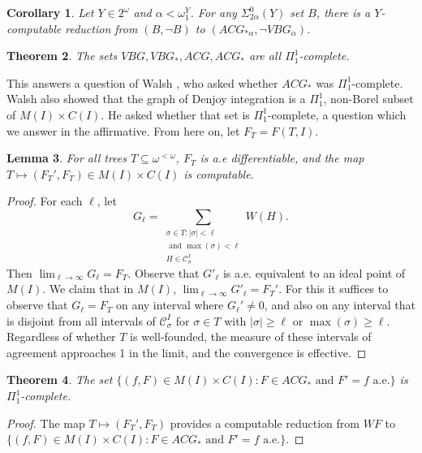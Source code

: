 \documentclass[12pt]{amsart}
\newtheorem{theorem}{Theorem}
\newtheorem{cor}[theorem]{Corollary}
\newtheorem{lemma}[theorem]{Lemma}
\begin{document}
\begin{cor} Let $Y \in 2^\omega$ and $\alpha < \omega_1^Y$. 
For any $\Sigma^0_{2\alpha}(Y)$ set $B$, there is a $Y$-computable 
reduction from $(B, \neg B)$ to $(ACG_{\ast\alpha}, \neg VBG_\alpha)$.
\end{cor}

\begin{theorem}
The sets $VBG, VBG_\ast, ACG, ACG_\ast$ are all $\Pi^1_1$-complete.
\end{theorem}

This answers a question of Walsh \cite{walsh}, 
who asked whether $ACG_\ast$ was $\Pi^1_1$-complete.  Walsh 
also showed that the graph of Denjoy integration is a $\Pi^1_1$, 
non-Borel subset of $M(I)\times C(I)$.
He asked whether that set is $\Pi^1_1$-complete, 
a question which we answer in the affirmative.
From here on, 
let $F_T = F(T,I)$.

\begin{lemma}\label{lem:19}
For all trees $T\subseteq \omega^{<\omega}$, $F_T$ is a.e differentiable, and the map 
$T \mapsto (F_T', F_T)\in M(I)\times C(I)$ is computable.
\end{lemma}
\begin{proof}
For each $\ell$, let $$G_\ell = \sum_{\substack{\sigma \in T : |\sigma| < \ell \\ \text{ and } \max(\sigma) < \ell \\ H \in \mathcal C^I_\sigma}} W(H).$$
Then $\lim_{\ell\rightarrow \infty} G_\ell = F_T$.  Observe that 
$G'_\ell$ is a.e. equivalent to an ideal point of $M(I)$. 
We claim that in $M(I)$, $\lim_{\ell\rightarrow \infty} G'_\ell = F_T'$.  For this 
it suffices to observe that $G_\ell = F_T$ on any interval where $G_\ell' \neq 0$, 
and also on any interval that is disjoint from all intervals of
$\mathcal C^I_\sigma$ for $\sigma \in T$ with $|\sigma| \geq \ell$ or 
$\max(\sigma) \geq \ell$.  Regardless of whether $T$ is well-founded,
the measure of these intervals of agreement 
approaches 
1 in the limit, and the convergence is effective.
\end{proof}

\begin{theorem} The set $\{(f,F) \in M(I)\times C(I) : F \in ACG_\ast \text{ and } F'=f \text{ a.e.}\}$ 
is $\Pi^1_1$-complete.
\end{theorem}
\begin{proof}
The map 
$T \mapsto (F_T', F_T)$ provides a computable reduction from $WF$ to 
$\{(f,F) \in M(I)\times C(I) : F\in ACG_\ast \text{ and } F'=f \text{ a.e.}\}$.
\end{proof}
\end{document}
